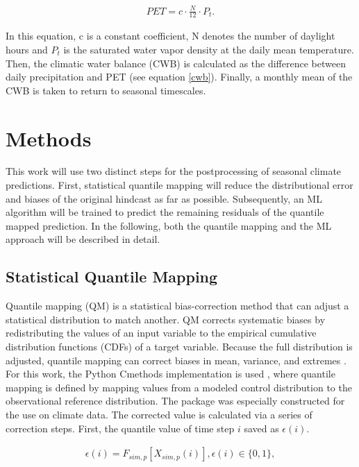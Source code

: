 \documentclass[ba-lentz.tex]{subfile}
\begin{document}
\begin{align}
    PET = c \cdot \frac{N}{12} \cdot P_{t} .
\end{align}

In this equation, c is a constant coefficient, N denotes the number of daylight hours and $P_{t}$ is the saturated water vapor density at the daily mean temperature. \\
Then, the climatic water balance (CWB) is calculated as the difference between daily precipitation and PET (see equation \ref{cwb}).
Finally, a monthly mean of the CWB is taken to return to seasonal timescales. \\

\section{Methods}\label{methods}

This work will use two distinct steps for the postprocessing of seasonal climate predictions.
First, statistical quantile mapping will reduce the distributional error and biases of the original hindcast as far as possible.
Subsequently, an ML algorithm will be trained to predict the remaining residuals of the quantile mapped prediction.
In the following, both the quantile mapping and the ML approach will be described in detail.

\subsection{Statistical Quantile Mapping}\label{qm}

Quantile mapping (QM) is a statistical bias-correction method that can adjust a statistical distribution to match another.
QM corrects systematic biases by redistributing the values of an input variable to the empirical cumulative distribution functions (CDFs) of a target variable.
Because the full distribution is adjusted, quantile mapping can correct biases in mean, variance, and extremes \parencite{schwertfeger_python_2023}.
For this work, the Python Cmethods implementation is used \parencite{schwertfeger_python_2023}, where quantile mapping is defined by mapping values from a modeled control distribution to the observational reference distribution.
The package was especially constructed for the use on climate data.
The corrected value is calculated via a series of correction steps.
First, the quantile value of time step $i$ saved as $\epsilon (i)$.

\begin{align}
    \epsilon (i) = F_{sim, p} [X_{sim,p}(i)], \epsilon (i) \in \{0, 1\} ,
\end{align}
\end{document}
